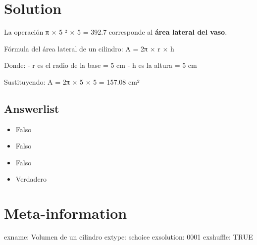 \documentclass[
]{article}
\providecommand{\tightlist}{%
  \setlength{\itemsep}{0pt}\setlength{\parskip}{0pt}}
\begin{document}
\section{Solution}\label{solution}

La operación π × 5 ² × 5 = 392.7 corresponde al \textbf{área lateral del
vaso}.

Fórmula del área lateral de un cilindro: A = 2π × r × h

Donde: - r es el radio de la base = 5 cm - h es la altura = 5 cm

Sustituyendo: A = 2π × 5 × 5 = 157.08 cm²

\subsection{Answerlist}\label{answerlist-1}

\begin{itemize}
\tightlist
\item
  Falso
\item
  Falso
\item
  Falso
\item
  Verdadero
\end{itemize}

\section{Meta-information}\label{meta-information}

exname: Volumen de un cilindro extype: schoice exsolution: 0001
exshuffle: TRUE
\end{document}
